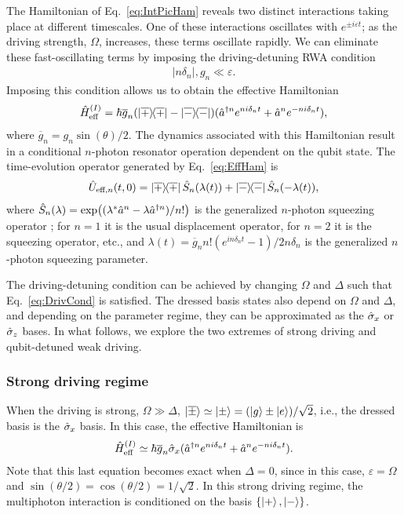 The Hamiltonian of Eq.~\eqref{eq:IntPicHam} reveals two distinct interactions taking place at different timescales. One of these interactions oscillates with $e^{\pm i \varepsilon t}$; as the driving strength, $\Omega$, increases, these terms oscillate rapidly. We can eliminate these fast-oscillating terms by imposing the driving-detuning RWA condition \begin{align}\label{eq:DrivCond}
    |n\delta_n|,g_n\ll \varepsilon.
\end{align}
Imposing this condition allows us to obtain the effective Hamiltonian
\begin{align}\label{eq:EffHam}
\hat{H}^{(I)}_{\text{eff}}=\hbar \overline{g}_n (\dyad{\overline{+}}-\dyad{\overline{-}})(\hat{a}^{\dagger n} e^{ni\delta_n t}+\hat{a}^n e^{-ni\delta_n t}),
\end{align}
where $\overline{g}_n=g_n\sin(\theta)/2.$
The dynamics associated with this Hamiltonian result in a conditional $n$-photon {resonator operation dependent on the qubit state}. { The time-evolution operator generated by Eq.~\eqref{eq:EffHam} is \begin{align}\label{eq:GenTimeEvOp}
\hat{U}_{\text{eff},n}(t,0)=\dyad{\overline{+}}\hat{S}_n(\lambda(t)) + \dyad{\overline{-}}\hat{S}_n(-\lambda(t)), 
\end{align}
where $\hat{S}_n(\lambda)=\exp((\lambda^* \hat{a}^n - 
\lambda \hat{a}^{\dagger n})/n! )$ is the generalized $n$-photon squeezing operator \cite{GeneralizedSqueezing}; for $n=1$ it is the usual displacement operator, for $n=2$ it is the squeezing operator, etc., and $\lambda(t)=\overline{g}_n n! (e^{in \delta_n t}-1)/2n\delta_n $ is the generalized $n$-photon squeezing parameter.}

The driving-detuning condition can be achieved by changing $\Omega$ and $\Delta$ such that Eq.~\eqref{eq:DrivCond} is satisfied. The dressed basis states also depend on $\Omega$ and $\Delta$, and depending on the parameter regime, they can be approximated as the $\hat{\sigma}_x$ or $\hat{\sigma}_z$ bases. In what follows, we explore the two extremes of strong driving and qubit-detuned weak driving. 
\subsubsection{Strong driving regime}\label{sec:StrongDriv}
When the driving is strong, $\Omega \gg \Delta$, $\ket{\overline{\pm}}\simeq\ket{\pm}=(\ket{g}\pm\ket{e})/\sqrt{2}$, i.e., the dressed basis is the $\hat{\sigma}_x$ basis.
 In this case, the effective Hamiltonian is \begin{align}\label{eq:StrongDriv}
\hat{H}_{\text{eff}}^{(I)}\simeq\hbar\overline{g}_n\hat{\sigma}_x(\hat{a}^{\dagger n} e^{ni\delta_n t}+\hat{a}^n e^{-ni\delta_n t}).
\end{align}
Note that this last equation becomes exact when $\Delta=0$, since in this case, $\varepsilon=\Omega$ and $\sin(\theta/2)=\cos(\theta/2)=1/\sqrt{2}$. In this strong driving regime, the multiphoton interaction is conditioned on the basis $\{\ket{+},\ket{-}\}$.

